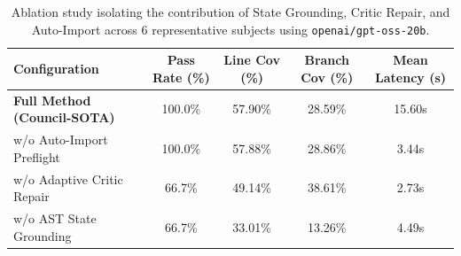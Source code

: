 \begin{table}[t]
\centering
\small
\caption{Ablation study isolating the contribution of State Grounding, Critic Repair, and Auto-Import across 6 representative subjects using \texttt{openai/gpt-oss-20b}.}
\label{tab:ablation_study}
\begin{tabular}{l c c c c}
\toprule
\textbf{Configuration} & \textbf{Pass Rate (\%)} & \textbf{Line Cov (\%)} & \textbf{Branch Cov (\%)} & \textbf{Mean Latency (s)} \\
\midrule
\textbf{Full Method (Council-SOTA)} & 100.0\% & 57.90\% & 28.59\% & 15.60s \\
w/o Auto-Import Preflight & 100.0\% & 57.88\% & 28.86\% & 3.44s \\
w/o Adaptive Critic Repair & 66.7\% & 49.14\% & 38.61\% & 2.73s \\
w/o AST State Grounding & 66.7\% & 33.01\% & 13.26\% & 4.49s \\
\bottomrule
\end{tabular}
\end{table}

